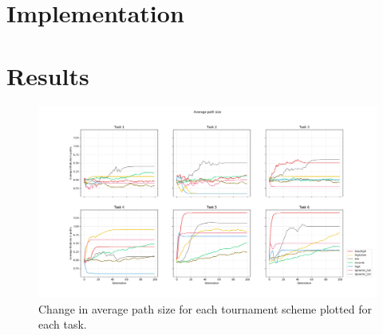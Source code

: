 


 


\section{Implementation}\label{Search-implementation}




\section{Results}

\begin{figure}[h]
    \includegraphics[width=\textwidth]{Chapters/Experiments/search_algo/figures/Average_path_size.png}
    \caption{Change in average path size for each tournament scheme plotted for each task.}
    \label{fig:search.avg_path_size}
\end{figure}

